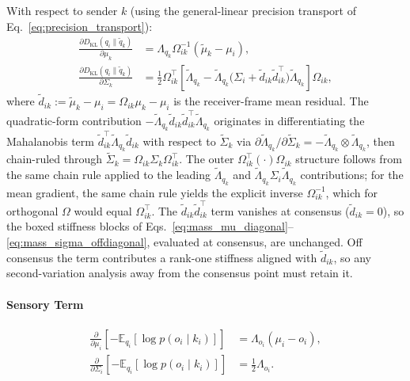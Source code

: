 \documentclass[11pt]{article}
\begin{document}
With respect to sender $k$ (using the general-linear precision transport of Eq.~\eqref{eq:precision_transport}):
\begin{align}
\frac{\partial D_{\mathrm{KL}}(q_i \| \tilde{q}_k)}{\partial \mu_k} &= \Lambda_{q_k}\Omega_{ik}^{-1}(\tilde{\mu}_k - \mu_i), \\
\frac{\partial D_{\mathrm{KL}}(q_i \| \tilde{q}_k)}{\partial \Sigma_k} &= \frac{1}{2}\Omega_{ik}^\top\left[\tilde{\Lambda}_{q_k} - \tilde{\Lambda}_{q_k}\big(\Sigma_i + \tilde{d}_{ik}\tilde{d}_{ik}^\top\big)\tilde{\Lambda}_{q_k}\right]\Omega_{ik},
\end{align}
where $\tilde{d}_{ik} := \tilde{\mu}_k - \mu_i = \Omega_{ik}\mu_k - \mu_i$ is the receiver-frame mean residual. The quadratic-form contribution $-\tilde{\Lambda}_{q_k}\tilde{d}_{ik}\tilde{d}_{ik}^\top\tilde{\Lambda}_{q_k}$ originates in differentiating the Mahalanobis term $\tilde{d}_{ik}^\top \tilde{\Lambda}_{q_k}\tilde{d}_{ik}$ with respect to $\tilde{\Sigma}_k$ via $\partial \tilde{\Lambda}_{q_k}/\partial \tilde{\Sigma}_k = -\tilde{\Lambda}_{q_k}\otimes\tilde{\Lambda}_{q_k}$, then chain-ruled through $\tilde{\Sigma}_k = \Omega_{ik}\Sigma_k\Omega_{ik}^\top$. The outer $\Omega_{ik}^\top(\cdot)\Omega_{ik}$ structure follows from the same chain rule applied to the leading $\tilde{\Lambda}_{q_k}$ and $\tilde{\Lambda}_{q_k}\Sigma_i\tilde{\Lambda}_{q_k}$ contributions; for the mean gradient, the same chain rule yields the explicit inverse $\Omega_{ik}^{-1}$, which for orthogonal $\Omega$ would equal $\Omega_{ik}^\top$. The $\tilde{d}_{ik}\tilde{d}_{ik}^\top$ term vanishes at consensus ($\tilde{d}_{ik} = 0$), so the boxed stiffness blocks of Eqs.~\eqref{eq:mass_mu_diagonal}--\eqref{eq:mass_sigma_offdiagonal}, evaluated at consensus, are unchanged. Off consensus the term contributes a rank-one stiffness aligned with $\tilde{d}_{ik}$, so any second-variation analysis away from the consensus point must retain it.

\paragraph{Sensory Term}
\begin{align}
\frac{\partial}{\partial \mu_i}\left[-\mathbb{E}_{q_i}[\log p(o_i \mid k_i)]\right] &= \Lambda_{o_i}(\mu_i - o_i), \\
\frac{\partial}{\partial \Sigma_i}\left[-\mathbb{E}_{q_i}[\log p(o_i \mid k_i)]\right] &= \frac{1}{2}\Lambda_{o_i}.
\end{align}
\end{document}
